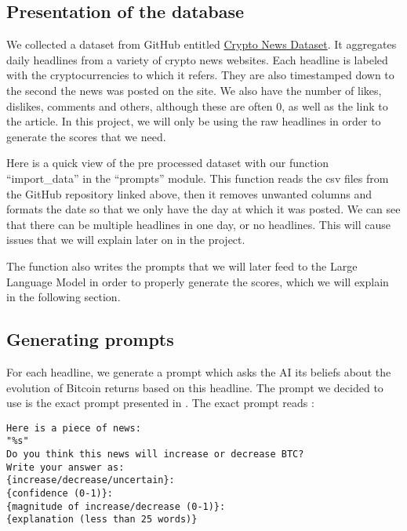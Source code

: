 \documentclass[
  a4paper]{article}
\begin{document}
\hypertarget{presentation-of-the-database}{%
\subsection{Presentation of the
database}\label{presentation-of-the-database}}

We collected a dataset from GitHub entitled
\href{https://github.com/soheilrahsaz/cryptoNewsDataset}{Crypto News
Dataset}. It aggregates daily headlines from a variety of crypto news
websites. Each headline is labeled with the cryptocurrencies to which it
refers. They are also timestamped down to the second the news was posted
on the site. We also have the number of likes, dislikes, comments and
others, although these are often 0, as well as the link to the article.
In this project, we will only be using the raw headlines in order to
generate the scores that we need.

Here is a quick view of the pre processed dataset with our function
``import\_data'' in the ``prompts'' module. This function reads the csv
files from the GitHub repository linked above, then it removes unwanted
columns and formats the date so that we only have the day at which it
was posted. We can see that there can be multiple headlines in one day,
or no headlines. This will cause issues that we will explain later on in
the project.

The function also writes the prompts that we will later feed to the
Large Language Model in order to properly generate the scores, which we
will explain in the following section.

\hypertarget{generating-prompts}{%
\subsection{Generating prompts}\label{generating-prompts}}

For each headline, we generate a prompt which asks the AI its beliefs
about the evolution of Bitcoin returns based on this headline. The
prompt we decided to use is the exact prompt presented in
\textcite{leland_bybee_2025} . The exact prompt reads :

\begin{verbatim}
Here is a piece of news:
"%s"
Do you think this news will increase or decrease BTC?
Write your answer as: 
{increase/decrease/uncertain}:
{confidence (0-1)}:
{magnitude of increase/decrease (0-1)}:
{explanation (less than 25 words)}
\end{verbatim}
\end{document}
